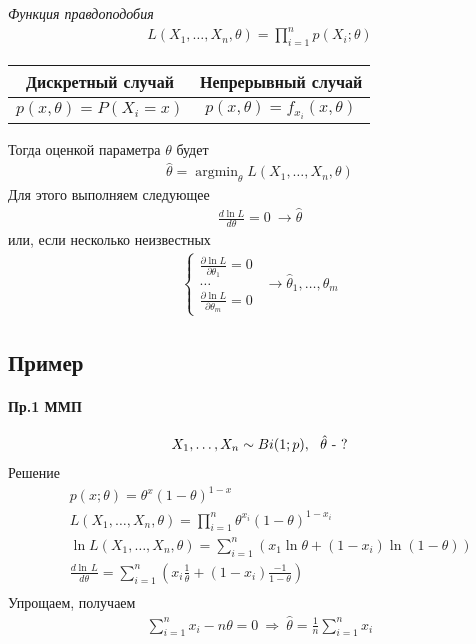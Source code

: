 \documentclass[12pt]{extarticle}
\DeclareMathOperator*{\argmax}{argmin}   %
\begin{document}
\textit{Функция правдоподобия}
\begin{eqnarray*}
    L(X_{1},\ldots,X_{n},\theta)=\prod_{i=1}^{n}p(X_{i};\theta)
\end{eqnarray*}
\begin{center} \begin{tabular}{|c|c|}
    Дискретный случай & Непрерывный случай \\\hline
    $p(x,\theta)=P(X_{i}=x)$ & $p(x,\theta)=f_{x_{i}}(x,\theta)$\\\hline
\end{tabular} \end{center}
Тогда оценкой параметра $\theta$ будет
\begin{eqnarray*}
    \hat{\theta}=\argmax_{\theta}L(X_{1},\ldots,X_{n},\theta)
\end{eqnarray*}
Для этого выполняем следующее
\begin{eqnarray*}
    \frac{d\ln L}{d\theta}=0\ \to \hat{\theta}
\end{eqnarray*}
или, если несколько неизвестных
\begin{eqnarray*}
\left\{ \begin{array}{l}
        \frac{\partial\ln L}{\partial\theta_{1}}=0\\
        \ldots\\
        \frac{\partial\ln L}{\partial\theta_{m}}=0
\end{array} \right.\ \ \to \hat{\theta}_{1},\ldots,\hat{\theta}_{m}
\end{eqnarray*}

\subsection{Пример}
\paragraph{Пр.1 ММП}
\begin{eqnarray*}
    X_{1},\ldots,X_{n}\sim Bi(1;p),\ \ \textmd{$\hat{\theta}$ - ?}
\end{eqnarray*}
Решение
\begin{eqnarray*}
    &&p(x;\theta)=\theta^{x}(1-\theta)^{1-x}\\
    &&L(X_{1},\ldots,X_{n},\theta)
    =\prod_{i=1}^{n}\theta^{x_{i}}(1-\theta)^{1-x_{i}}\\
    &&\ln L(X_{1},\ldots,X_{n},\theta)
    =\sum\limits_{i=1}^{n}(x_{1}\ln \theta+(1-x_{i})\ln(1-\theta))\\
    &&\frac{d\ln\,L}{d\theta}
    =\sum\limits_{i=1}^{n}
    \left(x_{i}\frac{1}{\theta}+(1-x_{i})\frac{-1}{1-\theta}\right)\\
\end{eqnarray*}
Упрощаем, получаем
\begin{eqnarray*}
    \sum\limits_{i=1}^{n}x_{i}-n\theta=0\ \Rightarrow
    \ \hat{\theta}=\frac{1}{n}\sum\limits_{i=1}^{n}x_{i}
\end{eqnarray*}
\end{document}
